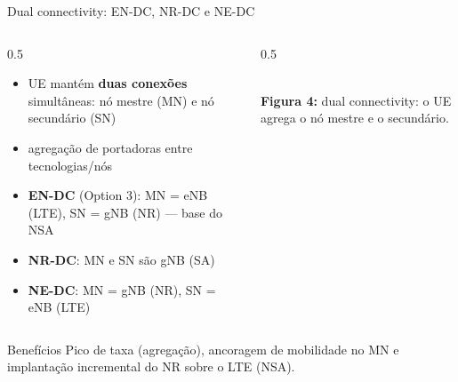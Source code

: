 \documentclass[aspectratio=169,11pt]{beamer}
\begin{document}
\begin{frame}{Dual connectivity: EN-DC, NR-DC e NE-DC}
  \begin{columns}
    \begin{column}{0.5\textwidth}
      \begin{itemize}
        \item UE mantém \textbf{duas conexões} simultâneas: nó mestre (MN) e nó secundário (SN)
        \item agregação de portadoras entre tecnologias/nós
        \item \textbf{EN-DC} (Option 3): MN = eNB (LTE), SN = gNB (NR) --- base do NSA
        \item \textbf{NR-DC}: MN e SN são gNB (SA)
        \item \textbf{NE-DC}: MN = gNB (NR), SN = eNB (LTE)
      \end{itemize}
    \end{column}
    \begin{column}{0.5\textwidth}
      \begin{center}
        \\[1mm]
        {\scriptsize \textbf{Figura 4:} dual connectivity: o UE agrega o nó mestre e o secundário.}
      \end{center}
    \end{column}
  \end{columns}
  \begin{block}{Benefícios}
    Pico de taxa (agregação), ancoragem de mobilidade no MN e implantação incremental do NR sobre o LTE (NSA).
  \end{block}
\end{frame}
\end{document}
